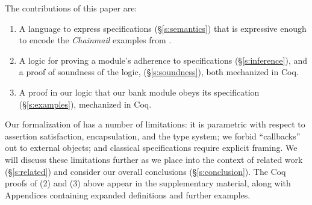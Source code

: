 %
The contributions of this paper are:\begin{enumerate}
 \item
A language to
express \Nec specifications (\S\ref{s:semantics}) that is  expressive
enough to encode the \emph{Chainmail} examples from . 
 \item
A logic for proving a module's adherence to 
 \Nec specifications (\S\ref{s:inference}), and a proof of soundness of the logic, (\S\ref{s:soundness}),
both mechanized in Coq. 
 \item
A proof in our logic %
  that our bank module obeys its \Nec specification (\S\ref{s:examples}), mechanized in Coq.
\end{enumerate}



Our formalization of \Nec has a number of limitations: 
it is 
parametric with respect to assertion
satisfaction, encapsulation, and the type system;
we forbid 
``callbacks'' out to external objects; and
classical specifications require explicit framing.
We will discuss these limitations further as we place \Nec into the context of 
related work (\S\ref{s:related}) and consider our overall conclusions
(\S\ref{s:conclusion}). 
%
The Coq proofs of 
(2) and (3) above %
appear in the
supplementary material, along with Appendices containing expanded 
definitions and further examples.
 
